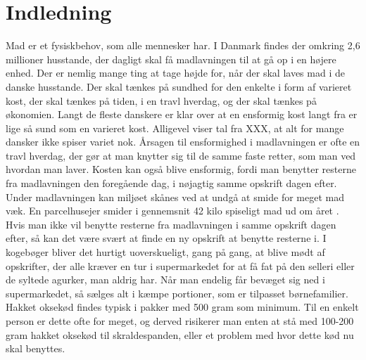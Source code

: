 \chapter{Indledning}
\label{chap:indledning}

Mad er et fysiskbehov, som alle mennesker har. I Danmark findes der omkring 2,6 millioner husstande\cite{husstande}, der dagligt skal få madlavningen til at gå op i en højere enhed. Der er nemlig mange ting at tage højde for, når der skal laves mad i de danske husstande. Der skal tænkes på sundhed for den enkelte i form af varieret kost, der skal tænkes på tiden, i en travl hverdag, og der skal tænkes på økonomien. Langt de fleste danskere er klar over at en ensformig kost langt fra er lige så sund som en varieret kost. Alligevel viser tal fra XXX, at alt for mange dansker ikke spiser variet nok. Årsagen til ensformighed i madlavningen er ofte en travl hverdag, der gør at man knytter sig til de samme faste retter, som man ved hvordan man laver. Kosten kan også blive ensformig, fordi man benytter resterne fra madlavningen den foregående dag, i nøjagtig samme opskrift dagen efter. Under madlavningen kan miljøet skånes ved at undgå at smide for meget mad væk. En parcelhusejer smider i gennemsnit 42 kilo spiseligt mad ud om året \cite{madspildpol}. Hvis man ikke vil benytte resterne fra madlavningen i samme opskrift dagen efter, så kan det være svært at finde en ny opskrift at benytte resterne i. I kogebøger bliver det hurtigt uoverskueligt, gang på gang, at blive mødt af opskrifter, der alle kræver en tur i supermarkedet for at få fat på den selleri eller de syltede agurker, man aldrig har. Når man endelig får bevæget sig ned i supermarkedet, så sælges alt i kæmpe portioner, som er tilpasset børnefamilier. Hakket oksekød findes typisk i pakker med 500 gram som minimum. Til en enkelt person er dette ofte for meget, og derved risikerer man enten at stå med 100-200 gram hakket oksekød til skraldespanden, eller et problem med hvor dette kød nu skal benyttes.


